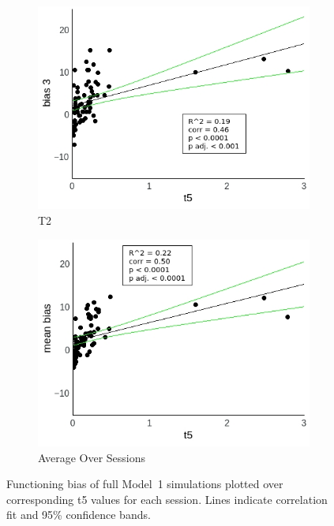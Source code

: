 \documentclass[a4paper]{scrreprt}
\begin{document}
\begin{figure}
\begin{subfigure}[b]{0.49\textwidth}
        \includegraphics[width=\textwidth]{figs/sec3/t5/t5_diff_3_mod1mod1.jpeg}
        \caption{T2}
    \end{subfigure}
    \begin{subfigure}[b]{0.49\textwidth}
        \includegraphics[width=\textwidth]{figs/sec3/t5/t5_diff_mean_mod1mod1.jpeg}
        \caption{Average Over Sessions}
    \end{subfigure}
\caption{Functioning bias of full Model~1 simulations plotted over corresponding t5 values for each session. Lines indicate correlation fit and 95\% confidence bands.}
\label{fig:t5_diff_mod1mod1}
\end{figure}
\end{document}
